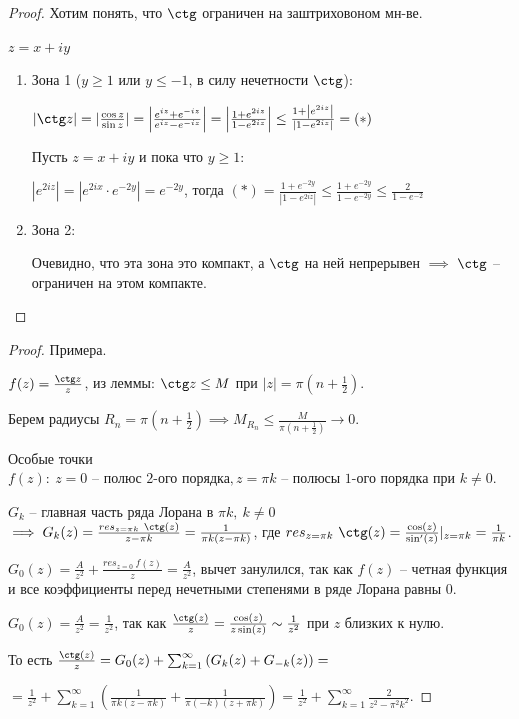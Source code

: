 \begin{proof}
    Хотим понять, что $\ctg$ ограничен на заштриховоном мн-ве.

    $z = x + iy$

    \begin{enumerate}
        \item {
            Зона 1 ($y \geq 1$ или $y \leq -1$, в силу нечетности $\ctg$):

            $|\ctg z| = |\frac{\cos z}{\sin z}| = \left|\frac{e^{iz} + e^{-iz}}{e^{iz} - e^{-iz}}\right| = \left| \frac{1 + e^{2iz}}{1 - e^{2iz}} \right| \leq  \frac{1 + \left|e^{2iz}\right|}{\left|1 - e^{2iz}\right|} = (*)$

            Пусть $z = x + iy$ и пока что $y \geq 1$:
        
            $|e^{2iz}| = |e^{2ix} \cdot e^{-2y}| = e^{-2y}$, тогда $(*) = \frac{1 + e^{-2y}}{|1 - e^{2iz}|} \leq \frac{1 + e^{-2y}}{1-e^{-2y}} \leq \frac{2}{1 - e^{-2}}$ 
        }
        \item {
            Зона 2:

            Очевидно, что эта зона это компакт, а $\ctg$ на ней непрерывен $\implies$ $\ctg$ -- ограничен на этом компакте.
        }
    \end{enumerate}
\end{proof}

\begin{proof}
    Примера.

    $f(z) = \frac{\ctg z}{z}$, из леммы: $\ctg z \leq M$ при $|z| = \pi (n + \frac{1}{2})$.

    Берем радиусы $R_n = \pi (n + \frac{1}{2}) \implies M_{R_n} \leq \frac{M}{\pi (n + \frac{1}{2})} \rightarrow 0$.

    Особые точки $f(z): \ z = 0 \text{ -- полюс 2-ого порядка}, z = \pi k \text{ -- полюсы 1-ого порядка при } k \neq 0$.

    $G_k$ -- главная часть ряда Лорана в $\pi k, \ k \neq 0$ $\implies G_k(z) = \frac{res_{z = \pi k} \ \ctg(z)}{z - \pi k} = \frac{1}{\pi k(z - \pi k)}$, где $res_{z = \pi k} \ \ctg(z) = \frac{\cos(z)}{\sin'(z)} |_{z = \pi k} = \frac{1}{\pi k}$.


    $G_0(z) = \frac{A}{z^2} + \frac{res_{z = 0} \ f(z)}{z} = \frac{A}{z^2}$, вычет занулился, так как $f(z)$ -- четная функция и все коэффициенты перед нечетными степенями в ряде Лорана равны $0$.

    $G_0(z) = \frac{A}{z^2} = \frac{1}{z^2}$, так как $\frac{\ctg(z)}{z} = \frac{\cos(z)}{z \sin(z)} \sim \frac{1}{z^2}$ при $z$ близких к нулю.

    То есть $\frac{\ctg(z)}{z} = G_0(z) + \sum_{k=1}^{\infty} \left(G_{k}(z) + G_{-k}(z)\right) =$
    
    $= \frac{1}{z^2} + \sum_{k=1}^{\infty} \left( \frac{1}{\pi k(z - \pi k)} + \frac{1}{\pi (-k) (z + \pi k)} \right) = \frac{1}{z^2} + \sum_{k=1}^{\infty} \frac{2}{z^2 - \pi^2 k^2}$.
\end{proof}

